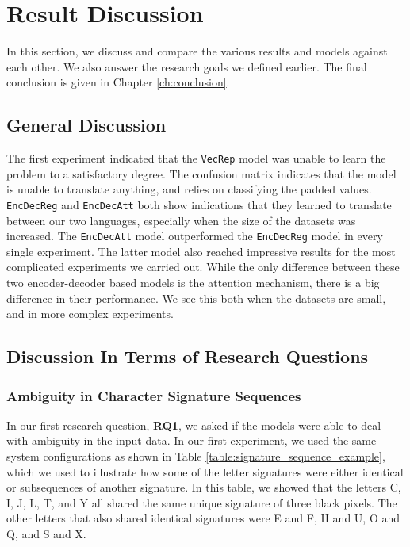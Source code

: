 
\section{Result Discussion}
\label{sec:result_discussion}
In this section, we discuss and compare the various results and models against each other. We also answer the research goals we defined earlier. The final conclusion is given in Chapter \ref{ch:conclusion}.

\subsection{General Discussion}
The first experiment indicated that the {\tt VecRep} model was unable to learn the problem to a satisfactory degree. The confusion matrix indicates that the model is unable to translate anything, and relies on classifying the padded values. {\tt EncDecReg} and {\tt EncDecAtt} both show indications that they learned to translate between our two languages, especially when the size of the datasets was increased. The {\tt EncDecAtt} model outperformed the {\tt EncDecReg} model in every single experiment. The latter model also reached impressive results for the most complicated experiments we carried out. While the only difference between these two encoder-decoder based models is the attention mechanism, there is a big difference in their performance. We see this both when the datasets are small, and in more complex experiments.

\subsection{Discussion In Terms of Research Questions}

\subsubsection{Ambiguity in Character Signature Sequences}
In our first research question, \textbf{RQ1}, we asked if the models were able to deal with ambiguity in the input data. In our first experiment, we used the same system configurations as shown in Table \ref{table:signature_sequence_example}, which we used to illustrate how some of the letter signatures were either identical or subsequences of another signature. In this table, we showed that the letters C, I, J, L, T, and Y all shared the same unique signature of three black pixels. The other letters that also shared identical signatures were E and F, H and U, O and Q, and S and X. 

